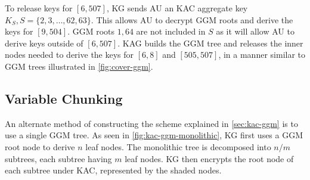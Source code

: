\documentclass[hyp,a4paper,12pt,openbib]{socreport}
\begin{document}
To release keys for $[6, 507]$, KG sends AU an KAC aggregate key $K_S, S=\{2,3,\dots,62,63\}$. This allows AU to decrypt GGM roots and derive the keys for $[9, 504]$. GGM roots $1,64$ are not included in $S$ as it will allow AU to derive keys outside of $[6,507]$. KAG builds the GGM tree and releases the inner nodes needed to derive the keys for $[6,8]$ and $[505,507]$, in a manner similar to GGM trees illustrated in \cref{fig:cover-ggm}.



\subsection{Variable Chunking}
\label{sec:mono-kac-ggm}

An alternate method of constructing the scheme explained in \cref{sec:kac-ggm} is to use a single GGM tree. As seen in \cref{fig:kac-ggm-monolithic}, KG first uses a GGM root node to derive $n$ leaf nodes. The monolithic tree is decomposed into $n/m$ subtrees, each subtree having $m$ leaf nodes. KG then encrypts the root node of each subtree under KAC, represented by the shaded nodes.
\end{document}
